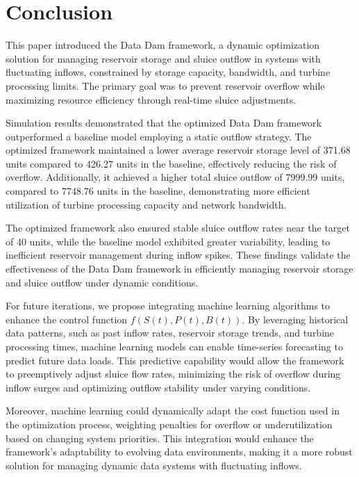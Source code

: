 \section{Conclusion}
This paper introduced the Data Dam framework, a dynamic optimization solution for managing reservoir storage and sluice outflow in systems with fluctuating inflows, constrained by storage capacity, bandwidth, and turbine processing limits. The primary goal was to prevent reservoir overflow while maximizing resource efficiency through real-time sluice adjustments.

Simulation results demonstrated that the optimized Data Dam framework outperformed a baseline model employing a static outflow strategy. The optimized framework maintained a lower average reservoir storage level of 371.68 units compared to 426.27 units in the baseline, effectively reducing the risk of overflow. Additionally, it achieved a higher total sluice outflow of 7999.99 units, compared to 7748.76 units in the baseline, demonstrating more efficient utilization of turbine processing capacity and network bandwidth.

The optimized framework also ensured stable sluice outflow rates near the target of 40 units, while the baseline model exhibited greater variability, leading to inefficient reservoir management during inflow spikes. These findings validate the effectiveness of the Data Dam framework in efficiently managing reservoir storage and sluice outflow under dynamic conditions.

For future iterations, we propose integrating machine learning algorithms to enhance the control function \( f(S(t), P(t), B(t)) \). By leveraging historical data patterns, such as past inflow rates, reservoir storage trends, and turbine processing times, machine learning models can enable time-series forecasting to predict future data loads. This predictive capability would allow the framework to preemptively adjust sluice flow rates, minimizing the risk of overflow during inflow surges and optimizing outflow stability under varying conditions. 

Moreover, machine learning could dynamically adapt the cost function used in the optimization process, weighting penalties for overflow or underutilization based on changing system priorities. This integration would enhance the framework's adaptability to evolving data environments, making it a more robust solution for managing dynamic data systems with fluctuating inflows.
